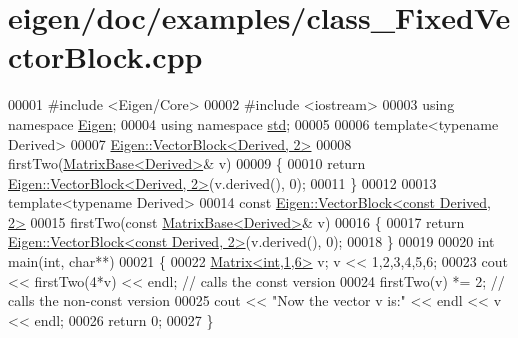 \hypertarget{eigen_2doc_2examples_2class___fixed_vector_block_8cpp_source}{}\section{eigen/doc/examples/class\+\_\+\+Fixed\+Vector\+Block.cpp}
\label{eigen_2doc_2examples_2class___fixed_vector_block_8cpp_source}

\begin{DoxyCode}
00001 \textcolor{preprocessor}{#include <Eigen/Core>}
00002 \textcolor{preprocessor}{#include <iostream>}
00003 \textcolor{keyword}{using namespace }\hyperlink{namespace_eigen}{Eigen};
00004 \textcolor{keyword}{using namespace }\hyperlink{namespacestd}{std};
00005 
00006 \textcolor{keyword}{template}<\textcolor{keyword}{typename} Derived>
00007 \hyperlink{group___core___module_class_eigen_1_1_vector_block}{Eigen::VectorBlock<Derived, 2>}
00008 firstTwo(\hyperlink{group___core___module_class_eigen_1_1_matrix_base}{MatrixBase<Derived>}& v)
00009 \{
00010   \textcolor{keywordflow}{return} \hyperlink{group___core___module_class_eigen_1_1_vector_block}{Eigen::VectorBlock<Derived, 2>}(v.derived(), 0);
00011 \}
00012 
00013 \textcolor{keyword}{template}<\textcolor{keyword}{typename} Derived>
00014 \textcolor{keyword}{const} \hyperlink{group___core___module_class_eigen_1_1_vector_block}{Eigen::VectorBlock<const Derived, 2>}
00015 firstTwo(\textcolor{keyword}{const} \hyperlink{group___core___module_class_eigen_1_1_matrix_base}{MatrixBase<Derived>}& v)
00016 \{
00017   \textcolor{keywordflow}{return} \hyperlink{group___core___module_class_eigen_1_1_vector_block}{Eigen::VectorBlock<const Derived, 2>}(v.derived(), 0);
00018 \}
00019 
00020 \textcolor{keywordtype}{int} main(\textcolor{keywordtype}{int}, \textcolor{keywordtype}{char}**)
00021 \{
00022   \hyperlink{group___core___module_class_eigen_1_1_matrix}{Matrix<int,1,6>} v; v << 1,2,3,4,5,6;
00023   cout << firstTwo(4*v) << endl; \textcolor{comment}{// calls the const version}
00024   firstTwo(v) *= 2;              \textcolor{comment}{// calls the non-const version}
00025   cout << \textcolor{stringliteral}{"Now the vector v is:"} << endl << v << endl;
00026   \textcolor{keywordflow}{return} 0;
00027 \}
\end{DoxyCode}
